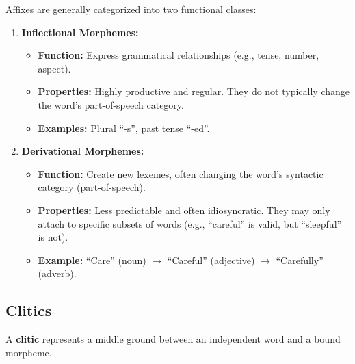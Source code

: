 \documentclass[
  italian,
  11pt,
]{article}
\providecommand{\tightlist}{%
  \setlength{\itemsep}{0pt}\setlength{\parskip}{0pt}}
\begin{document}
Affixes are generally categorized into two functional classes:

\begin{enumerate}
\def\labelenumi{\arabic{enumi}.}
\tightlist
\item
  \textbf{Inflectional Morphemes:}

  \begin{itemize}
  \tightlist
  \item
    \textbf{Function:} Express grammatical relationships (e.g., tense,
    number, aspect).
  \item
    \textbf{Properties:} Highly productive and regular. They do not
    typically change the word's part-of-speech category.
  \item
    \textbf{Examples:} Plural ``-s'', past tense ``-ed''.
  \end{itemize}
\item
  \textbf{Derivational Morphemes:}

  \begin{itemize}
  \tightlist
  \item
    \textbf{Function:} Create new lexemes, often changing the word's
    syntactic category (part-of-speech).
  \item
    \textbf{Properties:} Less predictable and often idiosyncratic. They
    may only attach to specific subsets of words (e.g., ``careful'' is
    valid, but ``sleepful'' is not).
  \item
    \textbf{Example:} ``Care'' (noun) \(\rightarrow\) ``Careful''
    (adjective) \(\rightarrow\) ``Carefully'' (adverb).
  \end{itemize}
\end{enumerate}

\subsection{Clitics}\label{clitics}

A \textbf{clitic} represents a middle ground between an independent word
and a bound morpheme.
\end{document}
